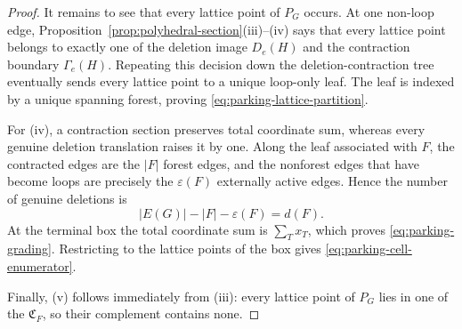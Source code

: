 \documentclass[10pt,a4paper]{amsart}
\newcommand{\eps}{\varepsilon}
\newcommand{\fC}{\mathfrak C}    %
\begin{document}
\begin{proof}
It remains to see that every lattice point of $P_G$ occurs.  At one
non-loop edge, Proposition~\ref{prop:polyhedral-section}(iii)--(iv) says that
every lattice point belongs to exactly one of the deletion image $D_e(H)$ and
the contraction boundary $\Gamma_e(H)$.  Repeating this decision down the
deletion-contraction tree eventually sends every lattice point to a unique
loop-only leaf.  The leaf is indexed by a unique spanning forest, proving
\eqref{eq:parking-lattice-partition}.

For (iv), a contraction section preserves total coordinate sum, whereas every
genuine deletion translation raises it by one.  Along the leaf associated with
$F$, the contracted edges are the $|F|$ forest edges, and the nonforest edges
that have become loops are precisely the $\eps(F)$ externally active
edges.  Hence the number of genuine deletions is
\[
   |E(G)|-|F|-\eps(F)=d(F).
\]
At the terminal box the total coordinate sum is $\sum_Tx_T$, which proves
\eqref{eq:parking-grading}.  Restricting to the lattice points of the box gives
\eqref{eq:parking-cell-enumerator}.

Finally, (v) follows immediately from (iii): every lattice point of $P_G$ lies
in one of the $\fC_F$, so their complement contains none.
\end{proof}
\end{document}
